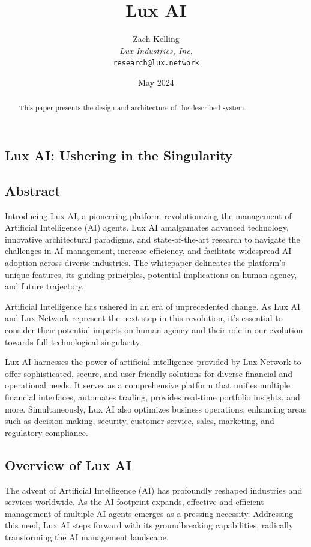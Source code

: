 \documentclass[11pt]{article}
\title{Lux AI}
\author{Zach Kelling\\\textit{Lux Industries, Inc.}\\\texttt{research@lux.network}}
\date{May 2024}
\begin{document}
\luxcoverpage

\begin{abstract}
This paper presents the design and architecture of the described system.
\end{abstract}

\tableofcontents
\newpage


\subsection{Lux AI: Ushering in the Singularity}

\subsection{Abstract}

Introducing Lux AI, a pioneering platform revolutionizing the management of Artificial Intelligence (AI) agents. Lux AI amalgamates advanced technology, innovative architectural paradigms, and state-of-the-art research to navigate the challenges in AI management, increase efficiency, and facilitate widespread AI adoption across diverse industries. The whitepaper delineates the platform's unique features, its guiding principles, potential implications on human agency, and future trajectory.


Artificial Intelligence has ushered in an era of unprecedented change. As Lux AI and Lux Network represent the next step in this revolution, it's essential to consider their potential impacts on human agency and their role in our evolution towards full technological singularity.


Lux AI harnesses the power of artificial intelligence provided by Lux Network to offer sophisticated, secure, and user-friendly solutions for diverse financial and operational needs. It serves as a comprehensive platform that unifies multiple financial interfaces, automates trading, provides real-time portfolio insights, and more. Simultaneously, Lux AI also optimizes business operations, enhancing areas such as decision-making, security, customer service, sales, marketing, and regulatory compliance.


\subsection{Overview of Lux AI}

The advent of Artificial Intelligence (AI) has profoundly reshaped industries and services worldwide. As the AI footprint expands, effective and efficient management of multiple AI agents emerges as a pressing necessity. Addressing this need, Lux AI steps forward with its groundbreaking capabilities, radically transforming the AI management landscape.
\end{document}
